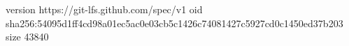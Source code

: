 version https://git-lfs.github.com/spec/v1
oid sha256:54095d1ff4cd98a01ec5ac0e03cb5c1426c74081427c5927cd0c1450ed37b203
size 43840
